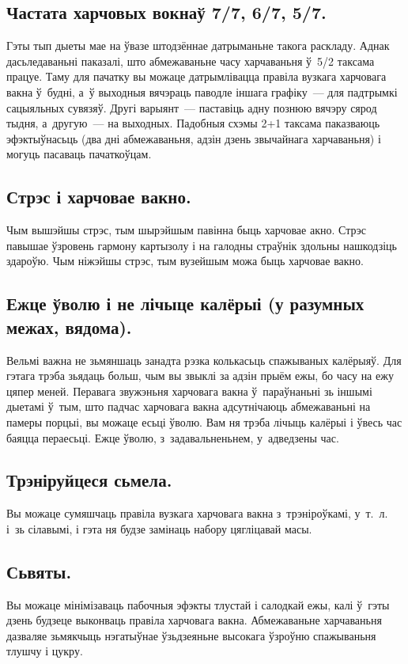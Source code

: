 \subsection{Частата харчовых вокнаў 7/7, 6/7, 5/7.}
Гэты тып дыеты мае на ўвазе штодзённае датрыманьне такога раскладу. Аднак дасьледаваньні паказалі, што абмежаваньне часу харчаваньня ў~5/2 таксама працуе. Таму для пачатку вы можаце датрымлівацца правіла вузкага харчовага вакна ў~будні, а~ў выходныя вячэраць паводле іншага графіку~--- для падтрымкі сацыяльных сувязяў. Другі варыянт~--- паставіць адну познюю вячэру сярод тыдня, а~другую~--- на выходных. Падобныя схэмы 2\kern0.5pt+1 таксама паказваюць эфэктыўнасьць (два дні абмежаваньня, адзін дзень звычайнага харчаваньня) і могуць пасаваць пачаткоўцам.

\subsection{Стрэс і харчовае вакно.}
Чым вышэйшы стрэс, тым шырэйшым павінна быць харчовае акно. Стрэс павышае ўзровень гармону картызолу і на галодны страўнік здольны нашкодзіць здароўю. Чым ніжэйшы стрэс, тым вузейшым можа быць харчовае вакно.

\subsection{Ежце ўволю і не лічыце калёрыі (у разумных межах, вядома).}
Вельмі важна не зьмяншаць занадта рэзка колькасьць спажываных калёрыяў. Для гэтага трэба зьядаць больш, чым вы звыклі за адзін прыём ежы, бо часу на ежу цяпер меней. Перавага звужэньня харчовага вакна ў~параўнаньні зь іншымі дыетамі ў~тым, што падчас харчовага вакна адсутнічаюць абмежаваньні на памеры порцыі, вы можаце есьці ўволю. Вам ня трэба лічыць калёрыі і ўвесь час баяцца пераесьці. Ежце ўволю, з~задавальненьнем, у~адведзены час.

\subsection{Трэніруйцеся сьмела.}
Вы можаце сумяшчаць правіла вузкага харчовага вакна з~трэніроўкамі, у~т.~л. і~зь сілавымі, і гэта ня будзе замінаць набору цягліцавай масы.

\subsection{Сьвяты.}
Вы можаце мінімізаваць пабочныя эфэкты тлустай і салодкай ежы, калі ў~гэты дзень будзеце выконваць правіла харчовага вакна. Абмежаваньне харчаваньня дазваляе зьмякчыць нэгатыўнае ўзьдзеяньне высокага ўзроўню спажываньня тлушчу і цукру.

